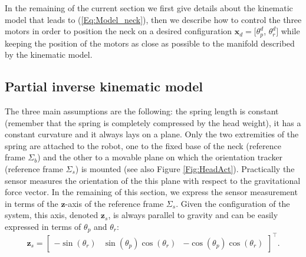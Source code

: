 \documentclass[conference]{IEEEtran}
\numberwithin{equation}{section}
\newcommand{\x}{\mathbf{x}}
\begin{document}
In the remaining of the current section we first give details about the kinematic model that leads to (\ref{Eq:Model_neck}), then we describe how to control the three motors in order to position the neck on a desired configuration $\x_d = [\theta_p^d$, $\theta_r^d]$ while keeping the position of the motors as close as possible to the manifold described by the kinematic model.

\subsection{Partial inverse kinematic model} \label{Sec:PartialInverseKinematicModel}

The three main assumptions are the following: the spring length is constant (remember that the spring is completely compressed by the head weight), it has a constant curvature and it always lays on a plane. Only the two extremities of the spring are attached to the robot, one to the fixed base of the neck (reference frame $\Sigma_b$) and the other to a movable plane on which the orientation tracker (reference frame $\Sigma_s$) is mounted (see also Figure \ref{Fig:HeadAct}). Practically the sensor measures the orientation of the this plane with respect to the gravitational force vector. In the remaining of this section, we express the sensor measurement in terms of the $\mathbf z$-axis of the reference frame $\Sigma_s$. Given the configuration of the system, this axis, denoted $\mathbf z_s$, is always parallel to gravity and can be easily expressed in terms of $\theta_p$ and $\theta_r$:
$$ \mathbf z_s = \begin{bmatrix}  -\sin(\theta_r) & \sin(\theta_p)\cos(\theta_r) & -\cos(\theta_p)\cos(\theta_r)\end{bmatrix}^\top.$$
\end{document}

